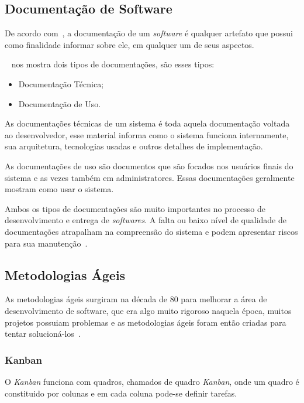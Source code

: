 \documentclass[12pt]{article}
\begin{document}
\subsection{Documentação de Software}

De acordo com~\cite{Forward02softwaredocumentation}, a documentação de um \textit{software} é qualquer
artefato que possui como finalidade informar sobre ele, em qualquer um de seus aspectos.

~\cite{Coelho_2009} nos mostra dois tipos de documentações, são esses tipos:

\begin{itemize}
	\item Documentação Técnica;
	\item Documentação de Uso.
\end{itemize}

As documentações técnicas de um sistema é toda aquela documentação voltada ao desenvolvedor, esse material
informa como o sistema funciona internamente, sua arquitetura, tecnologias usadas e outros detalhes de implementação.

As documentações de uso são documentos que são focados nos usuários finais do sistema e as vezes também em administratores.
Essas documentações geralmente mostram como usar o sistema.

Ambos os tipos de documentações são muito importantes no processo de desenvolvimento e entrega de \textit{softwares}.
A falta ou baixo nível de qualidade de documentações atrapalham na compreensão do sistema e podem apresentar
riscos para sua manutenção~\cite{deinvestigaccao}.

\subsection{Metodologias Ágeis}

As metodologias ágeis surgiram na década de 80 para melhorar a área de desenvolvimento de software,
que era algo muito rigoroso naquela época, muitos projetos possuiam problemas e as metodologias ágeis foram então
criadas para tentar solucioná-los~\cite{Santos05}.

\subsubsection{Kanban}

O \textit{Kanban} funciona com quadros, chamados de quadro \textit{Kanban}, onde um quadro é constituido por colunas e
em cada coluna pode-se definir tarefas.
\end{document}
